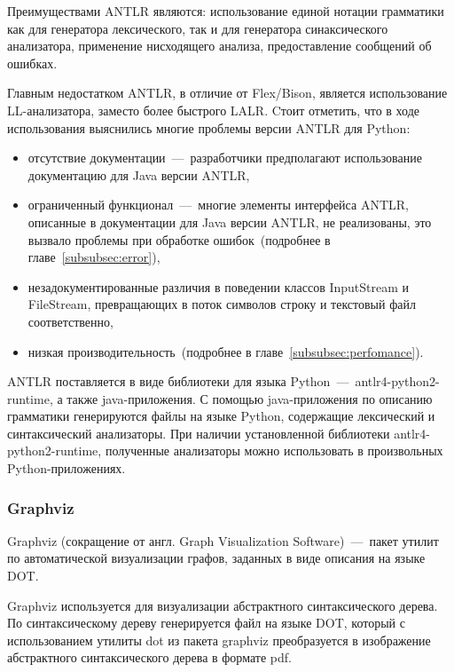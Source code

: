 \documentclass[12pt,a4paper,oneside]{extarticle}
\begin{document}
            Преимуществами ANTLR являются: использование единой нотации грамматики как для генератора лексического, так и для генератора синаксического анализатора, применение нисходящего анализа, предоставление сообщений об ошибках.

            Главным недостатком ANTLR, в отличие от Flex/Bison, является использование LL-анализатора, заместо более быстрого LALR.
            Cтоит отметить, что в ходе использования выяснились многие проблемы версии ANTLR для Python:
            \begin{itemize}
                \item отсутствие документации~---~разработчики предполагают использование документацию для Java версии ANTLR,
                \item ограниченный функционал~---~многие элементы интерфейса ANTLR, описанные в документации для Java версии ANTLR, не реализованы, это вызвало проблемы при обработке ошибок~(подробнее в главе~\ref{subsubsec:error}),
                \item незадокументированные различия в поведении классов InputStream и FileStream, превращающих в поток символов строку и текстовый файл соответственно,
                \item низкая производительность~(подробнее в главе~\ref{subsubsec:perfomance}).
            \end{itemize}

            ANTLR поставляется в виде библиотеки для языка Python~---~antlr4-python2-runtime, а также java-приложения.
            С помощью java-приложения по описанию грамматики генерируются файлы на языке Python, содержащие лексический и синтаксический анализаторы.
            При наличии установленной библиотеки antlr4-python2-runtime, полученные анализаторы можно использовать в произвольных Python-приложениях.            
        \subsubsection{Graphviz}
            Graphviz (сокращение от англ. Graph Visualization Software)~---~пакет утилит по автоматической визуализации графов, заданных в виде описания на языке DOT.

            Graphviz используется для визуализации абстрактного синтаксического дерева.
            По синтаксическому дереву генерируется файл на языке DOT, который с использованием утилиты dot из пакета graphviz преобразуется в изображение абстрактного синтаксического дерева в формате pdf.
\end{document}
